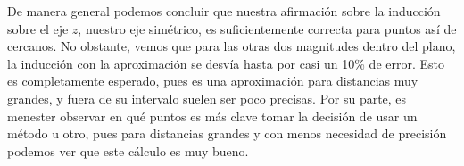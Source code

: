 \documentclass{article}
\begin{document}
De manera general podemos concluir que nuestra afirmación sobre la inducción sobre el eje \(z\), nuestro eje simétrico, es suficientemente
correcta para puntos así de cercanos. No obstante, vemos que para las otras dos magnitudes dentro del plano, la inducción con la aproximación
se desvía hasta por casi un 10\% de error. Esto es completamente esperado, pues es una aproximación para distancias muy grandes, y fuera de
su intervalo suelen ser poco precisas. Por su parte, es menester observar en qué puntos es más clave tomar la decisión de usar un método u
otro, pues para distancias grandes y con menos necesidad de precisión podemos ver que este cálculo es muy bueno.
\end{document}
